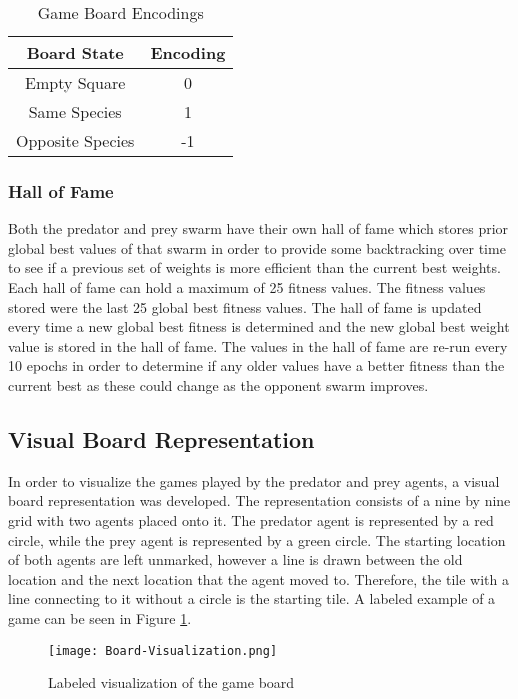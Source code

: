 \begin{table}
  \centering
  \begin{tabular}{|c|c|}
    \hline
    Board State & Encoding \\
    \hline
    Empty Square & 0 \\
    Same Species & 1 \\
    Opposite Species & -1\\
   \hline
  \end{tabular}
  \caption{Game Board Encodings}
  \label{tab:board-encoding-table}
\end{table}

\subsubsection{Hall of Fame}
Both the predator and prey swarm have their own hall of fame which stores prior global best values of that swarm in order to provide some backtracking over time to see if a previous set of weights is more efficient than the current best weights. Each hall of fame can hold a maximum of 25 fitness values. The fitness values stored were the last 25 global best fitness values. The hall of fame is updated every time a new global best fitness is determined and the new global best weight value is stored in the hall of fame. The values in the hall of fame are re-run every 10 epochs in order to determine if any older values have a better fitness than the current best as these could change as the opponent swarm improves.

\subsection{Visual Board Representation}
In order to visualize the games played by the predator and prey agents, a visual board representation was developed. The representation consists of a nine by nine grid with two agents placed onto it. The predator agent is represented by a red circle, while the prey agent is represented by a green circle. The starting location of both agents are left unmarked, however a line is drawn between the old location and the next location that the agent moved to. Therefore, the tile with a line connecting to it without a circle is the starting tile. A labeled example of a game can be seen in Figure \ref{fig:label-game-example}.


\begin{figure}
  \centering
  \texttt{[image: Board-Visualization.png]}
  \caption{Labeled visualization of the game board}
  \label{fig:label-game-example}
\end{figure}


